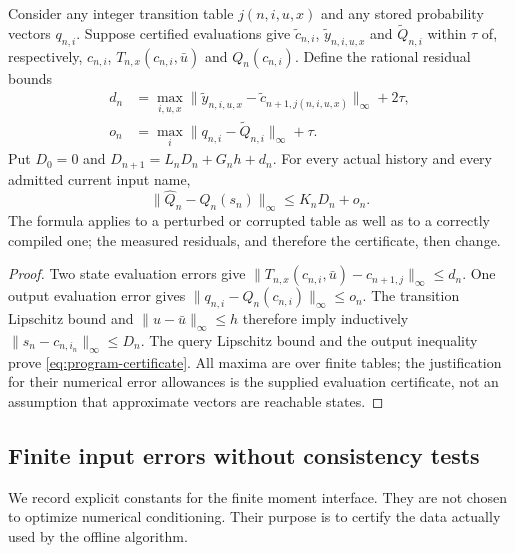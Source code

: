 \begin{proposition}
\label{prop:program-certificate}
Consider any integer transition table $j(n,i,u,x)$ and any stored
probability vectors $q_{n,i}$. Suppose certified evaluations give
$\widetilde c_{n,i}$, $\widetilde y_{n,i,u,x}$ and
$\widetilde Q_{n,i}$ within $\tau$ of, respectively,
$c_{n,i}$, $T_{n,x}(c_{n,i},\bar u)$ and $Q_n(c_{n,i})$.
Define the rational residual bounds
\begin{align*}
 d_n&=\max_{i,u,x}
  \|\widetilde y_{n,i,u,x}-\widetilde c_{n+1,j(n,i,u,x)}\|_\infty
       +2\tau,\\
 o_n&=\max_i\|q_{n,i}-\widetilde Q_{n,i}\|_\infty+\tau.
\end{align*}
Put $D_0=0$ and $D_{n+1}=L_nD_n+G_nh+d_n$. For every actual
history and every admitted current input name,
\begin{equation}\label{eq:program-certificate}
 \|\widehat Q_n-Q_n(s_n)\|_\infty\le K_nD_n+o_n.
\end{equation}
The formula applies to a perturbed or corrupted table as well as to a
correctly compiled one; the measured residuals, and therefore the
certificate, then change.
\end{proposition}
\begin{proof}
Two state evaluation errors give
$\|T_{n,x}(c_{n,i},\bar u)-c_{n+1,j}\|_\infty\le d_n$.
One output evaluation error gives
$\|q_{n,i}-Q_n(c_{n,i})\|_\infty\le o_n$.
The transition Lipschitz bound and $\|u-\bar u\|_\infty\le h$
therefore imply inductively
$\|s_n-c_{n,i_n}\|_\infty\le D_n$. The query Lipschitz bound and
the output inequality prove \eqref{eq:program-certificate}. All
maxima are over finite tables; the justification for their numerical
error allowances is the supplied evaluation certificate, not an
assumption that approximate vectors are reachable states.
\end{proof}

\subsection{Finite input errors without consistency tests}
We record explicit constants for the finite moment interface. They are
not chosen to optimize numerical conditioning. Their purpose is to
certify the data actually used by the offline algorithm.

